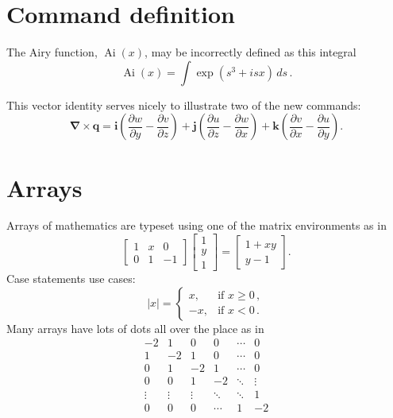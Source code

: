\documentclass[20pt,a4paper]{extarticle}
\begin{document}
\section{Command definition}

\newcommand{\Ai}{\operatorname{Ai}} 
The Airy function, $\Ai(x)$, may be incorrectly defined as this 
integral
\[
	\Ai(x)=\int\exp(s^3+isx)\,ds\,.
\]

\newcommand{\D}[2]{\frac{\partial #2}{\partial #1}}
\newcommand{\DD}[2]{\frac{\partial^2 #2}{\partial #1^2}}
\renewcommand{\vec}[1]{\boldsymbol{#1}}

This vector identity serves nicely to illustrate two of the new 
commands:
\[
	\vec\nabla\times\vec q
	=\vec i\left(\D yw-\D zv\right)
	+\vec j\left(\D zu-\D xw\right)
	+\vec k\left(\D xv-\D yu\right).
\]






\section{Arrays}

Arrays of mathematics are typeset using one of the matrix environments as 
in
\[
	\begin{bmatrix}
		1 & x & 0 \\
		0 & 1 & -1
	\end{bmatrix}\begin{bmatrix}
		1  \\
		y  \\
		1
	\end{bmatrix}
	=\begin{bmatrix}
		1+xy  \\
		y-1
	\end{bmatrix}.
\]
Case statements use cases:
\[
	|x|=\begin{cases}
		x, & \text{if }x\geq 0\,,  \\
		-x, & \text{if }x< 0\,.
	\end{cases}
\]
Many arrays have lots of dots all over the place as in
\[
	\begin{matrix}
		-2 & 1 & 0 & 0 & \cdots & 0  \\
		1 & -2 & 1 & 0 & \cdots & 0  \\
		0 & 1 & -2 & 1 & \cdots & 0  \\
		0 & 0 & 1 & -2 & \ddots & \vdots \\
		\vdots & \vdots & \vdots & \ddots & \ddots & 1  \\
		0 & 0 & 0 & \cdots & 1 & -2
	\end{matrix}
\]
\end{document}
